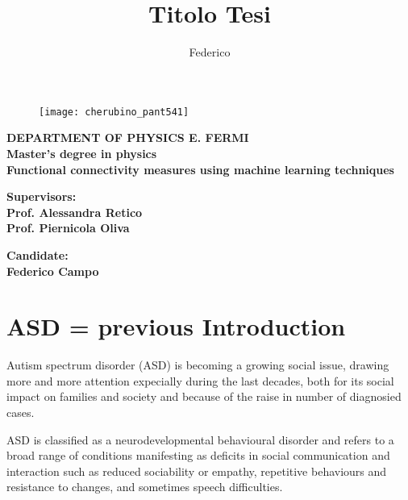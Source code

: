 \documentclass[12pt]{report}
\title{Titolo Tesi}
\author{Federico}
\begin{document}
\begin{titlepage}
\begin{figure}[t]
\centering
\texttt{[image: cherubino\_pant541]}
\end{figure}

\begin{center}
	\textbf{ DEPARTMENT OF PHYSICS E. FERMI\\ Master's degree in physics\\}
	\vspace{20mm}
    {\LARGE{\bf Functional connectivity measures using machine learning techniques}}
\end{center}

\vspace{36mm}

\begin{minipage}[t]{0.47\textwidth}
	{\large{\bf Supervisors:\\ Prof. Alessandra Retico\\ Prof. Piernicola Oliva}}
\end{minipage}\hfill\begin{minipage}[t]{0.47\textwidth}\raggedleft
	{\large{\bf Candidate: \\ Federico Campo}}
\end{minipage}

\vspace{40mm}


\end{titlepage}



\tableofcontents



\chapter{ASD = previous Introduction}

Autism spectrum disorder (ASD) is becoming a growing social issue, drawing more and more attention expecially during the last decades, both for its social impact on families and society and because of the raise in number of diagnosied cases.

ASD is classified as a neurodevelopmental behavioural disorder \cite{guze-1995} \cite{who-1993} and refers to a broad range of conditions manifesting as deficits in social communication and interaction such as reduced sociability or empathy, repetitive behaviours and resistance to changes, and sometimes speech difficulties.\cite{rapin-2008}
\end{document}
